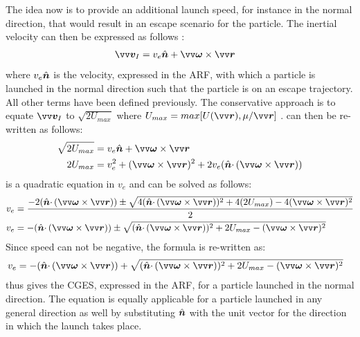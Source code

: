 \FloatBarrier
The idea now is to provide an additional launch speed, for instance in the normal direction, that would result in an escape scenario for the particle. The inertial velocity can then be expressed as follows \parencite{scheeresBook}:
\begin{align}
    \bv{v}_I &= v_{e}\buv{n} + \bv{\omega} \times \bv{r}
    \label{eqn:conservative_inertial_escape}
\end{align}
where $v_e\hat{\bm{n}}$ is the velocity, expressed in the \gls{ARF}, with which a particle is launched in the normal direction such that the particle is on an escape trajectory. All other terms have been defined previously. The conservative approach is to equate $\bv{v}_I$ to $\sqrt{2U_{max}}$ where $U_{max} = max[U(\bv{r}), \mu/\bv{r}]$ \parencite{scheeresBook}.  can then be re-written as follows:
\begin{align}
    \sqrt{2U_{max}} &= v_{e}\buv{n} + \bv{\omega} \times \bv{r} \\
    2U_{max} &= v_e^2 + (\bv{\omega} \times \bv{r})^2 + 2 v_e (\buv{n} \cdotp (\bv{\omega} \times \bv{r}))
    \label{eqn:conservative_quadratic}
\end{align}
 is a quadratic equation in $v_e$ and can be solved as follows:
\begin{align}
    v_e &= \frac{-2(\buv{n} \cdotp (\bv{\omega} \times \bv{r})) \pm \sqrt{4 (\buv{n} \cdotp (\bv{\omega} \times \bv{r}))^2 + 4 (2U_{max}) - 4(\bv{\omega} \times \bv{r})^2}}{2} \\
    v_e &= -(\buv{n} \cdotp (\bv{\omega} \times \bv{r})) \pm \sqrt{(\buv{n} \cdotp (\bv{\omega} \times \bv{r}))^2 + 2U_{max} - (\bv{\omega} \times {\bv{r}})^2}
\end{align}
Since speed can not be negative, the formula is re-written as:
\begin{align}
    v_e &= -(\buv{n} \cdotp (\bv{\omega} \times \bv{r})) + \sqrt{(\buv{n} \cdotp (\bv{\omega} \times \bv{r}))^2 + 2U_{max} - (\bv{\omega} \times {\bv{r}})^2}
    \label{eqn:conservative_escape_speed}
\end{align}
 thus gives the \gls{CGES}, expressed in the \gls{ARF}, for a particle launched in the normal direction. The equation is equally applicable for a particle launched in any general direction as well by substituting $\hat{\bm{n}}$ with the unit vector for the direction in which the launch takes place.

